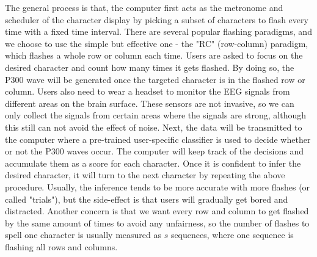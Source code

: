 \documentclass{article}
\begin{document}
The general process is that, the computer first acts as the metronome and scheduler of the character display by picking a subset of characters to flash every time with a fixed time interval. There are several popular flashing paradigms, and we choose to use the simple but effective one - the "RC" (row-column) paradigm, which flashes a whole row or column each time. Users are asked to focus on the desired character and count how many times it gets flashed. By doing so, the P300 wave will be generated once the targeted character is in the flashed row or column. Users also need to wear a headset to monitor the EEG signals from different areas on the brain surface. These sensors are not invasive, so we can only collect the signals from certain areas where the signals are strong, although this still can not avoid the effect of noise. Next, the data will be transmitted to the computer where a pre-trained user-specific classifier is used to decide whether or not the P300 waves occur. The computer will keep track of the decisions and accumulate them as a score for each character. Once it is confident to infer the desired character, it will turn to the next character by repeating the above procedure. Usually, the inference tends to be more accurate with more flashes (or called "trials"), but the side-effect is that users will gradually get bored and distracted. Another concern is that we want every row and column to get flashed by the same amount of times to avoid any unfairness, so the number of flashes to spell one character is usually measured as $s$ sequences, where one sequence is flashing all rows and columns.
\end{document}
